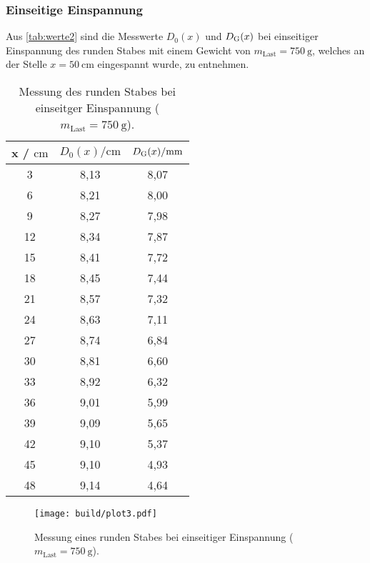 \subsubsection{Einseitige Einspannung}
\label{subsubsec:rundEinsEing}

Aus \autoref{tab:werte2} sind die Messwerte $D_0(x)$ und $D_{\text G}(x)$ bei einseitiger Einspannung des runden Stabes mit
einem Gewicht von $m_{\text{Last}} = \SI{750}{\gram}$, welches an der Stelle $x= \SI{50}{\cm}$ eingespannt wurde, zu entnehmen.


\sloppy
\begin{table}[H]
  \centering
  \caption{Messung des runden Stabes bei einseitger Einspannung ($m_{\text{Last}} = \SI{750}{\gram}$).}
  \label{tab:werte2}
  \begin{tabular}{c c c}
    \toprule
    x / $\si{\centi\meter} $ & $ D_0(x) / \si{\centi\meter}$ & $D_{\text G}(x) / \si{\milli\meter}$ \\
    \midrule
    3 & 8,13 & 8,07 \\
    6 & 8,21 & 8,00 \\
    9 & 8,27 & 7,98 \\
    12 & 8,34 & 7,87 \\
    15 & 8,41 & 7,72 \\
    18 & 8,45 & 7,44 \\
    21 & 8,57 & 7,32 \\
    24 & 8,63 & 7,11 \\
    27 & 8,74 & 6,84 \\
    30 & 8,81 & 6,60 \\
    33 & 8,92 & 6,32 \\
    36 & 9,01 & 5,99 \\
    39 & 9,09 & 5,65 \\
    42 & 9,10 & 5,37 \\
    45 & 9,10 & 4,93 \\
    48 & 9,14 & 4,64 \\
    \bottomrule
  \end{tabular}
\end{table}

\sloppy
\begin{figure}[H]
  \centering
  \texttt{[image: build/plot3.pdf]}
  \caption{Messung eines runden Stabes bei einseitiger Einspannung ($m_{\text{Last}} = \SI{750}{\gram}$).}
  \label{fig:plot3}
\end{figure}

